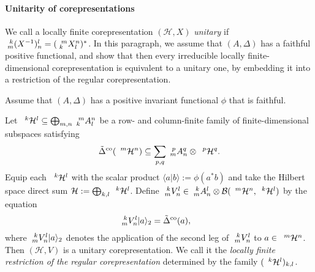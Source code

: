 \paragraph{Unitarity of corepresentations}
We call a locally finite corepresentation $(\mathcal{H},X)$
\emph{unitary} if $\Gr{(X^{-1})}{k}{l}{m}{n}=(\Gr{X}{m}{n}{k}{l})^{*}$.  In this paragraph, we assume that
$(A,\Delta)$ has a faithful positive functional, and show that then
every irreducible locally finite-dimensional corepresentation is
equivalent to a unitary one, by embedding it into a restriction of the
regular corepresentation.
\begin{Exa} \label{exa:rep-regular}
  Assume that $(A,\Delta)$ has a positive invariant functional $\phi$
  that is faithful. 

  Let $\Gru{\mathcal{H}}{k}{l} \subseteq \bigoplus_{m,n}
  \Gr{A}{m}{n}{k}{l}$ be a row- and column-finite family of
  finite-dimensional subspaces satisfying
\begin{align*}
 \tilde  \Delta^{\co} (\Gru{\mathcal{H}}{m}{n}) \subseteq \sum_{p,q}
 \Gr{A}{p}{q}{m}{n} \otimes \Gru{\mathcal{H}}{p}{q}.
\end{align*}
Equip each $\Gru{\mathcal{H}}{k}{l}$ with the scalar product $\langle
a|b\rangle:=\phi(a^{*}b)$ and take the Hilbert space direct sum
$\mathcal{H}:=\bigoplus_{k,l} \Gru{\mathcal{H}}{k}{l}$.
Define $\Gr{V}{k}{l}{m}{n} \in \Gr{A}{k}{l}{m}{n} \otimes
\mathcal{B}(\Gru{\mathcal{H}}{m}{n},\Gru{\mathcal{H}}{k}{l})$ by the
equation
\begin{align*}
  \Gr{V}{k}{l}{m}{n}|a\rangle_{2} &= \tilde \Delta^{\co}(a),
\end{align*}
where $\Gr{V}{k}{l}{m}{n}|a\rangle_{2}$  denotes the application of
the second leg of
$\Gr{V}{k}{l}{m}{n}$  to $a \in \Gru{\mathcal{H}}{m}{n}$. Then
$(\mathcal{H},V)$ is a unitary corepresentation. We call it the 
\emph{locally finite restriction of the regular corepresentation}
determined by the family $(\Gru{\mathcal{H}}{k}{l})_{k,l}$. 
\end{Exa}

